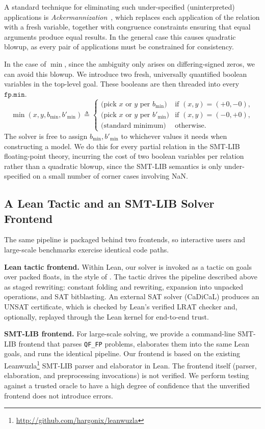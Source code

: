A standard technique for eliminating such under-specified (uninterpreted) applications
is \emph{Ackermannization}~\cite{ackermannization}, which replaces each application of the relation
with a fresh variable, together with congruence constraints ensuring
that equal arguments produce equal results.
In the general case this causes quadratic blowup,
as every pair of applications must be constrained for consistency.

In the case of $\min$, since the ambiguity only arises on differing-signed zeros, we can avoid this blowup.
We introduce two fresh, universally quantified boolean variables in the top-level goal.
These booleans are then threaded into every $\texttt{fp.min}$.
\[
  \min(x, y, b_{\min}, b'_{\min}) \triangleq
  \begin{cases}
    \text{(pick $x$ or $y$ per } b_{\min}) & \text{if } (x, y) = (+0, -0), \\
    \text{(pick $x$ or $y$ per } b'_{\min}) & \text{if } (x, y) = (-0, +0), \\
    \text{(standard minimum)} & \text{otherwise.}
  \end{cases}
\]
The solver is free to assign $b_{\min}, b'_{\min}$ to whichever values it needs when constructing a model.
We do this for every partial relation in the SMT-LIB floating-point theory,
incurring the cost of two boolean variables per relation rather than a quadratic blowup,
since the SMT-LIB semantics is only under-specified on a small number of corner cases involving NaN.

\subsection{A Lean Tactic and an SMT-LIB Solver Frontend}\label{sec:fp:frontends}

The same pipeline is packaged behind two frontends,
so interactive users and large-scale benchmarks exercise identical code paths.

\noindent\textbf{Lean tactic frontend.}
Within Lean, our solver is invoked as a tactic on goals over packed floats,
in the style of \bvdecide{}.
The tactic drives the pipeline described above as staged rewriting:
constant folding and rewriting, expansion into unpacked operations, and SAT bitblasting.
An external SAT solver (CaDiCaL) produces an UNSAT certificate,
which is checked by Lean's verified LRAT checker and, optionally,
replayed through the Lean kernel for end-to-end trust.

\noindent\textbf{SMT-LIB frontend.}
For large-scale solving, we provide a command-line SMT-LIB frontend that
parses \texttt{QF\_FP} problems, elaborates them into the same Lean goals,
and runs the identical pipeline.
Our frontend is based on the existing Leanwuzla\footnote{\url{http://github.com/hargonix/leanwuzla}} SMT-LIB parser and elaborator in Lean.
The frontend itself (parser, elaboration, and preprocessing invocations) is not verified.
We perform testing against a trusted oracle to have a high degree of confidence that the unverified frontend does not introduce errors.

